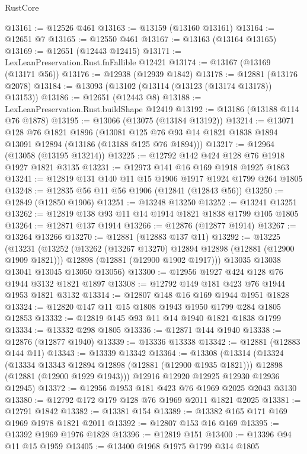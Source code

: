 \begin{lexlean}{RustCore}
\begin{coremodule}
@13161 := @12526 @461
@13163 := @13159 (@13160 @13161)
@13164 := @12651 @7
@13165 := @12550 @461
@13167 := @13163 (@13164 @13165)
@13169 := @12651 (@12443 @12415)
@13171 := LexLeanPreservation.Rust.fnFallible @12421
@13174 := @13167 (@13169 (@13171 @56))
@13176 := @12938 (@12939 @1842)
@13178 := @12881 (@13176 @2078)
@13184 := @13093 (@13102 (@13114 (@13123 (@13174 @13178)) @13153))
@13186 := @12651 (@12443 @8)
@13188 := LexLeanPreservation.Rust.buildShape @12419
@13192 := @13186 (@13188 @114 @76 @1878)
@13195 := @13066 (@13075 (@13184 @13192))
@13214 := @13071
    @128
    @76
    @1821
    @1896
    (@13081 @125 @76 @93 @14 @1821 @1838 @1894 @13091 @12894 (@13186 (@13188 @125 @76 @1894)))
@13217 := @12964 (@13058 (@13195 @13214))
@13225 := @12792 @142 @424 @128 @76 @1918 @1927 @1821 @3135
@13231 := @12973 @141 @16 @169 @1918 @1925 @1863
@13241 := @12819 @131 @140 @11 @15 @1906 @1917 @1924 @1799 @264 @1805
@13248 := @12835 @56 @11 @56 @1906 (@12841 (@12843 @56))
@13250 := @12849 (@12850 @1906)
@13251 := @13248 @13250
@13252 := @13241 @13251
@13262 := @12819 @138 @93 @11 @14 @1914 @1821 @1838 @1799 @105 @1805
@13264 := @12871 @137 @1914
@13266 := @12876 (@12877 @1914)
@13267 := @13264 @13266
@13270 := @12881 (@12883 @137 @11)
@13292 := @13225
    (@13231
      (@13252
        (@13262 (@13267 @13270) @12894 @12898 (@12881 (@12900 @1909 @1821)))
        @12898
        (@12881 (@12900 @1902 @1917)))
      @13035
      @13038
      @13041
      @13045
      @13050
      @13056)
@13300 := @12956 @1927 @424 @128 @76 @1944 @3132 @1821 @1897
@13308 := @12792 @149 @181 @423 @76 @1944 @1953 @1821 @3132
@13314 := @12807 @148 @16 @169 @1944 @1951 @1828
@13324 := @12820 @147 @11 @15 @1808 @1943 @1950 @1799 @284 @1805 @12853
@13332 := @12819 @145 @93 @11 @14 @1940 @1821 @1838 @1799
@13334 := @13332 @298 @1805
@13336 := @12871 @144 @1940
@13338 := @12876 (@12877 @1940)
@13339 := @13336 @13338
@13342 := @12881 (@12883 @144 @11)
@13343 := @13339 @13342
@13364 := @13308
    (@13314
      (@13324
        (@13334 @13343 @12894 @12898 (@12881 (@12900 @1935 @1821)))
        @12898
        (@12881 (@12900 @1929 @1943)))
      @12916
      @12920
      @12925
      @12930
      @12936
      @12945)
@13372 := @12956 @1953 @181 @423 @76 @1969 @2025 @2043 @3130
@13380 := @12792 @172 @179 @128 @76 @1969 @2011 @1821 @2025
@13381 := @12791 @1842
@13382 := @13381 @154
@13389 := @13382 @165 @171 @169 @1969 @1978 @1821 @2011
@13392 := @12807 @153 @16 @169
@13395 := @13392 @1969 @1976 @1828
@13396 := @12819 @151
@13400 := @13396 @94 @11 @15 @1959
@13405 := @13400 @1968 @1975 @1799 @314 @1805

\end{coremodule}
\end{lexlean}
